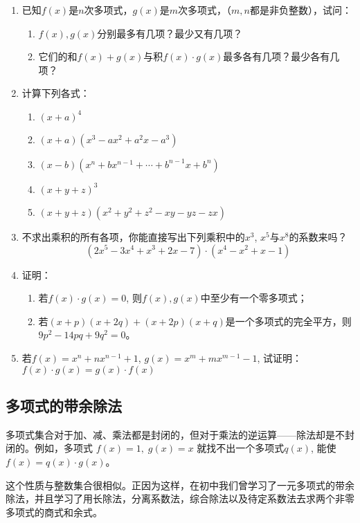 \begin{ex}
\begin{enumerate}
    \item 已知$f(x)$是$n$次多项式，$g(x)$是$m$次多项式，（$m,n$都是非负整数），试问：
    \begin{enumerate}
        \item $f(x),g(x)$分别最多有几项？最少又有几项？
        \item 它们的和$f(x)+g(x)$与积$f(x)\cdot g(x)$最多各有几项？最少各有几项？
    \end{enumerate}
   \item 计算下列各式：
\begin{enumerate}
    \item $(x+a)^4$
    \item $(x+a)(x^3-ax^2+a^2x-a^3)$
    \item $(x-b)(x^n+bx^{n-1}+\cdots+b^{n-1}x+b^n)$
    \item $(x+y+z)^3$
    \item $(x+y+z)(x^2+y^2+z^2-xy-yz-zx)$
\end{enumerate}
   
\item 不求出乘积的所有各项，你能直接写出下列乘积中的$x^3$, $x^5$与$x^8$的系数来吗？
\[(2x^5-3x^4+x^3+2x-7) \cdot (x^4-x^2+x-1)\]
\item 证明：
\begin{enumerate}
\item 若$f(x)\cdot  g(x)=0$, 则$f(x),g(x)$中至少有一个零多项式；
\item 若$(x+p)(x+2q)+(x+2p)(x+q)$是一个多项式的完全平方，则$9p^2-14pq+9q^2=0$。  
\end{enumerate}

\item 若$f(x)=x^n+nx^{n-1}+1$, $g(x)=x^m+mx^{m-1}-1$, 试证明：$f (x) \cdot g (x) =g (x) \cdot f (x)$
\end{enumerate}
\end{ex}

\subsection{多项式的带余除法}

多项式集合对于加、减、乘法都是封闭的，但对于乘法的逆运算——除法却是不封闭的。例如，多项式
$f (x) =1,\; g (x) =x$
就找不出一个多项式$q(x)$, 能使
$f(x) =q(x)\cdot g(x)$。

这个性质与整数集合很相似。正因为这样，在初中我们曾学习了一元多项式的带余除法，并且学习了用长除法，分离系数法，综合除法以及待定系数法去求两个非零多项式的商式和余式。

